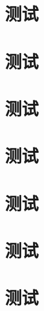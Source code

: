 \documentclass[library = {math.master}, type = for-library]{whuthesis}
\begin{document}
\section{测试}
\section{测试}
\section{测试}
\section{测试}


\section{测试}

\section{测试}
\zhlipsum[1-4]
\section{测试}
\zhlipsum[1-4]
\end{document}
